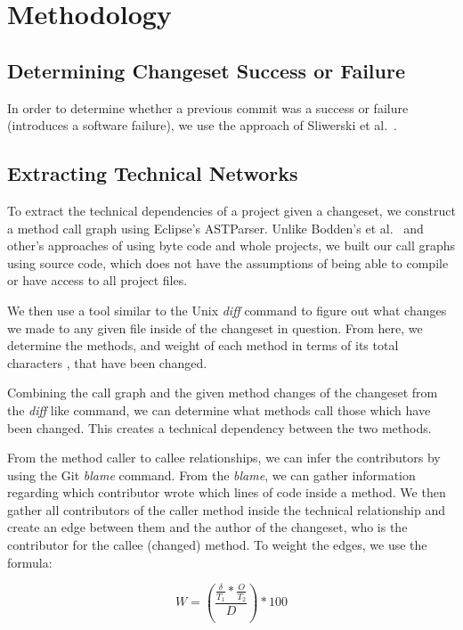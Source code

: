 \documentclass[conference]{IEEEtran}
\begin{document}
\section{Methodology}

\subsection{Determining Changeset Success or Failure}
In order to determine whether a previous commit was a success or failure (introduces a software
failure), we use the approach of Sliwerski et al.~\cite{Sliwerski:2005:CIF}.

\subsection{Extracting Technical Networks}
To extract the technical dependencies of a project given a changeset, we construct a method
call graph using Eclipse's ASTParser. 
Unlike  Bodden's et al.~\cite{Bodden:2003:HVJ} and other's approaches of using byte code
and whole projects, we built our call graphs using source code, which does not have the assumptions
of being able to compile or have access to all project files.

We then use a tool similar to the Unix \textit{diff} command to figure out what changes we made 
to any given file inside of the changeset in question. From here, we determine the methods, 
and weight of each method in terms of its total characters , that have been changed.

Combining the call graph and the given method changes of the changeset from the \textit{diff} like 
command,  we can determine what methods call those which have been changed. This creates a 
technical dependency between the two methods.

From the method caller to callee relationships, we can infer the contributors by using
the Git \textit{blame} command. From the \textit{blame}, we can gather information regarding which 
contributor  wrote which lines of code inside a method. We then gather all contributors of the 
caller method inside the technical relationship and create an edge between them and 
the author of the changeset, who is the contributor for the 
callee (changed) method. To weight the edges, we use the formula:

\begin{equation}\label{first}
W = (\frac{\frac{\delta}{T_{1}}*\frac{O}{T_{2}}}{D})*100
\end{equation}
\end{document}
